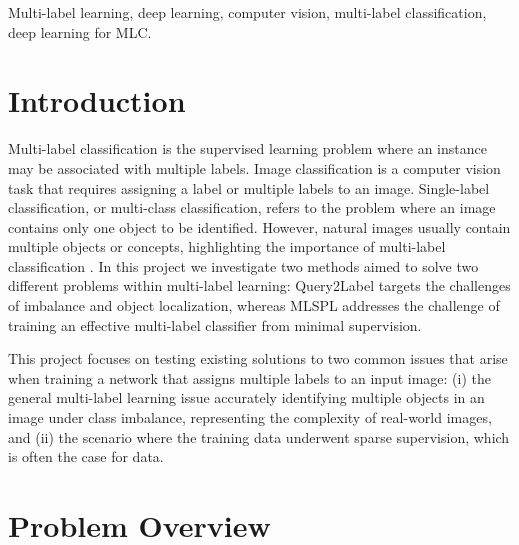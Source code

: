 \documentclass[lettersize,journal]{IEEEtran}
\begin{document}
\begin{IEEEkeywords}
Multi-label learning, deep learning, computer vision, multi-label
classification, deep learning for MLC. 

\end{IEEEkeywords}


\section{Introduction}






Multi-label classification is the supervised learning problem where an instance may be associated with multiple labels. Image classification is a computer vision task that requires assigning a label or multiple labels to an image. Single-label classification, or multi-class classification, refers to the problem where an image contains only one object to be identified. However, natural images usually contain multiple objects or concepts, highlighting the importance of multi-label classification \cite{ridnik2021mldecoderscalableversatileclassification}. In this project we investigate two methods aimed to solve two different problems within multi-label learning: Query2Label targets the challenges of imbalance and object localization, whereas MLSPL addresses the challenge of training an effective multi-label classifier from minimal supervision.

This project focuses on testing existing solutions to two common issues that arise when training a network that assigns multiple labels to an input image: (i) the general multi-label learning issue accurately identifying multiple objects in an image under class imbalance, representing the complexity of real-world images, and (ii) the scenario where the training data underwent sparse supervision, which is often the case for data.

\section{Problem Overview}
\end{document}
